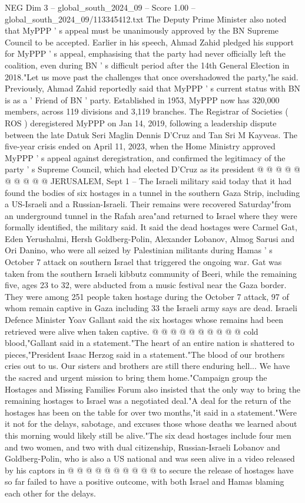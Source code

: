 \begin{textsample}{NEG Dim 3 – global\_south\_2024\_09 – Score 1.00 – global\_south\_2024\_09/113345412.txt}  \label{ex:f3_neg_132}
The Deputy Prime Minister also noted that MyPPP ' s appeal must be unanimously approved by the BN Supreme Council to be accepted.
Earlier in his speech, Ahmad Zahid pledged his support for MyPPP ' s appeal, emphasising that the party had never officially left the coalition, even during BN ' s difficult period after the 14th General Election in 2018."Let us move past the challenges that once overshadowed the party,"he said.
Previously, Ahmad Zahid reportedly said that MyPPP ' s current status with BN is as a ' Friend of BN ' party.
Established in 1953, MyPPP now has 320,000 members, across 119 divisions and 3,119 branches.
The Registrar of Societies ( ROS ) deregistered MyPPP on Jan 14, 2019, following a leadership dispute between the late Datuk Seri Maglin Dennis D'Cruz and Tan Sri M Kayveas.
The five-year crisis ended on April 11, 2023, when the Home Ministry approved MyPPP ' s appeal against deregistration, and confirmed the legitimacy of the party ' s Supreme Council, which had elected D'Cruz as its president @ @ @ @ @ @ @ @ @ @ JERUSALEM, Sept 1 -- The Israeli military said today that it had found the bodies of six hostages in a tunnel in the southern Gaza Strip, including a US-Israeli and a Russian-Israeli.
Their remains were recovered Saturday"from an underground tunnel in the Rafah area"and returned to Israel where they were formally identified, the military said.
It said the dead hostages were Carmel Gat, Eden Yerushalmi, Hersh Goldberg-Polin, Alexander Lobanov, Almog Sarusi and Ori Danino, who were all seized by Palestinian militants during Hamas ' s October 7 attack on southern Israel that triggered the ongoing war.
Gat was taken from the southern Israeli kibbutz community of Beeri, while the remaining five, ages 23 to 32, were abducted from a music festival near the Gaza border.
They were among 251 people taken hostage during the October 7 attack, 97 of whom remain captive in Gaza including 33 the Israeli army says are dead.
Israeli Defence Minister Yoav Gallant said the six hostages whose remains had been retrieved were alive when taken captive. @ @ @ @ @ @ @ @ @ @ cold blood,"Gallant said in a statement."The heart of an entire nation is shattered to pieces,"President Isaac Herzog said in a statement."The blood of our brothers cries out to us.
Our sisters and brothers are still there enduring hell...
We have the sacred and urgent mission to bring them home."Campaign group the Hostages and Missing Families Forum also insisted that the only way to bring the remaining hostages to Israel was a negotiated deal."A deal for the return of the hostages has been on the table for over two months,"it said in a statement."Were it not for the delays, sabotage, and excuses those whose deaths we learned about this morning would likely still be alive."The six dead hostages include four men and two women, and two with dual citizenship, Russian-Israeli Lobanov and Goldberg-Polin, who is also a US national and was seen alive in a video released by his captors in @ @ @ @ @ @ @ @ @ @ to secure the release of hostages have so far failed to have a positive outcome, with both Israel and Hamas blaming each other for the delays.

\end{textsample}
